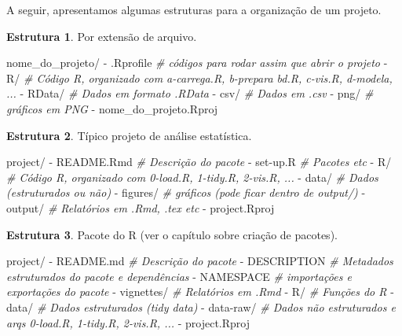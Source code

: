 \documentclass[
]{book}
\newenvironment{Shaded}{\begin{snugshade}}{\end{snugshade}}
\newcommand{\CommentTok}[1]{\textcolor[rgb]{0.56,0.35,0.01}{\textit{#1}}}
\newcommand{\ExtensionTok}[1]{#1}
\newcommand{\NormalTok}[1]{#1}
\begin{document}
A seguir, apresentamos algumas estruturas para a organização de um projeto.

\textbf{Estrutura 1}. Por extensão de arquivo.

\begin{Shaded}
\begin{Highlighting}[]
\ExtensionTok{nome_do_projeto/}
  \ExtensionTok{-}\NormalTok{ .Rprofile   }\CommentTok{# códigos para rodar assim que abrir o projeto}
  \ExtensionTok{-}\NormalTok{ R/          }\CommentTok{# Código R, organizado com a-carrega.R, b-prepara bd.R, c-vis.R, d-modela, ...}
  \ExtensionTok{-}\NormalTok{ RData/      }\CommentTok{# Dados em formato .RData}
  \ExtensionTok{-}\NormalTok{ csv/        }\CommentTok{# Dados em .csv}
  \ExtensionTok{-}\NormalTok{ png/        }\CommentTok{# gráficos em PNG}
  \ExtensionTok{-}\NormalTok{ nome_do_projeto.Rproj}
\end{Highlighting}
\end{Shaded}

\textbf{Estrutura 2}. Típico projeto de análise estatística.

\begin{Shaded}
\begin{Highlighting}[]
\ExtensionTok{project/}
  \ExtensionTok{-}\NormalTok{ README.Rmd   }\CommentTok{# Descrição do pacote}
  \ExtensionTok{-}\NormalTok{ set-up.R     }\CommentTok{# Pacotes etc}
  \ExtensionTok{-}\NormalTok{ R/           }\CommentTok{# Código R, organizado com 0-load.R, 1-tidy.R, 2-vis.R, ...}
  \ExtensionTok{-}\NormalTok{ data/        }\CommentTok{# Dados (estruturados ou não)}
  \ExtensionTok{-}\NormalTok{ figures/     }\CommentTok{# gráficos (pode ficar dentro de output/)}
  \ExtensionTok{-}\NormalTok{ output/      }\CommentTok{# Relatórios em .Rmd, .tex etc}
  \ExtensionTok{-}\NormalTok{ project.Rproj}
\end{Highlighting}
\end{Shaded}

\textbf{Estrutura 3}. Pacote do R (ver o capítulo sobre criação de pacotes).

\begin{Shaded}
\begin{Highlighting}[]
\ExtensionTok{project/}
  \ExtensionTok{-}\NormalTok{ README.md    }\CommentTok{# Descrição do pacote}
  \ExtensionTok{-}\NormalTok{ DESCRIPTION  }\CommentTok{# Metadados estruturados do pacote e dependências}
  \ExtensionTok{-}\NormalTok{ NAMESPACE    }\CommentTok{# importações e exportações do pacote}
  \ExtensionTok{-}\NormalTok{ vignettes/   }\CommentTok{# Relatórios em .Rmd}
  \ExtensionTok{-}\NormalTok{ R/           }\CommentTok{# Funções do R}
  \ExtensionTok{-}\NormalTok{ data/        }\CommentTok{# Dados estruturados (tidy data)}
  \ExtensionTok{-}\NormalTok{ data-raw/    }\CommentTok{# Dados não estruturados e arqs 0-load.R, 1-tidy.R, 2-vis.R, ...}
  \ExtensionTok{-}\NormalTok{ project.Rproj}
\end{Highlighting}
\end{Shaded}
\end{document}
